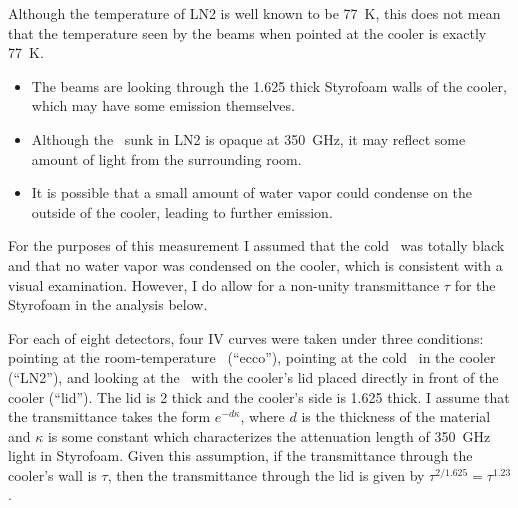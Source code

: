 Although the temperature of LN2 is well known to be \SI{77}{\kelvin}, this does not mean that the temperature seen by the beams when pointed at the cooler is exactly \SI{77}{\kelvin}.
\begin{itemize}
  \item The beams are looking through the \SI{1.625}{\in} thick Styrofoam walls of the cooler, which may have some emission themselves.
  \item Although the \ecco\ sunk in LN2 is opaque at \SI{350}{\GHz}, it may reflect some amount of light from the surrounding room.
  \item It is possible that a small amount of water vapor could condense on the outside of the cooler, leading to further emission.
\end{itemize}
For the purposes of this measurement I assumed that the cold \ecco\ was totally black and that no water vapor was condensed on the cooler, which is consistent with a visual examination.
However, I do allow for a non-unity transmittance $\tau$ for the Styrofoam in the analysis below.

For each of eight detectors, four IV curves were taken under three conditions: pointing at the room-temperature \ecco\ (``ecco''), pointing at the cold \ecco\ in the cooler (``LN2''), and looking at the \ecco\ with the cooler's lid placed directly in front of the cooler (``lid'').
The lid is \SI{2}{\in} thick and the cooler's side is \SI{1.625}{\in} thick.
I assume that the transmittance takes the form $e^{-d \kappa}$, where $d$ is the thickness of the material and $\kappa$ is some constant which characterizes the attenuation length of \SI{350}{\GHz} light in Styrofoam.
Given this assumption, if the transmittance through the cooler's wall is $\tau$, then the transmittance through the lid is given by $\tau^{2/1.625} = \tau^{1.23}$.

